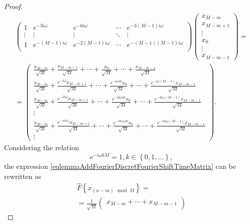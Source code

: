 \begin{proof}
\begin{eqnarray}
\begin{pmatrix}
1 & e^{-3 i \omega} & e^{-6 i \omega} & \cdots & 
e^{-3 \left( M - 1 \right) i \omega} \\
\vdots & \vdots & \vdots & \ddots & \vdots \\
1 & e^{-\left( M - 1 \right) i \omega} & e^{-2\left( M - 1 \right) i \omega} & \cdots & 
e^{- \left( M - 1 \right)\left( M - 1 \right) i \omega} \\
\end{pmatrix}
\begin{pmatrix}
x_{M - m} \\
x_{M - m + 1}\\ 
\vdots \\
x_0 \\
\vdots \\
x_{M - m - 1}
\end{pmatrix} = 
\nonumber \\
= 
\begin{pmatrix}
\frac{x_{M - m}}{\sqrt{M}} + \frac{x_{M - m + 1}}{\sqrt{M}} + \cdots + 
\frac{x_0}{\sqrt{M}} + \cdots + \frac{x_{M - m - 1}}{\sqrt{M}}\\
\frac{x_{M - m}}{\sqrt{M}} + 
\frac{e^{-i \omega} x_{M - m + 1}}{\sqrt{M}} + 
\cdots + 
\frac{e^{-i \omega m  } x_0}{\sqrt{M}} + 
\cdots +
\frac{e^{-i \omega \left( M - 1 \right) } x_{M - m - 1}}{\sqrt{M}}\\ 
\frac{x_{M - m}}{\sqrt{M}} + 
\frac{e^{-2 i \omega} x_{M - m + 1}}{\sqrt{M}} + 
\cdots + 
\frac{e^{-2 i \omega m  } x_0}{\sqrt{M}} + 
\cdots +
\frac{e^{-2 i \omega \left( M - 1 \right) } x_{M - m - 1}}{\sqrt{M}}\\ 
\vdots \\
\frac{x_{M - m}}{\sqrt{M}} + 
\frac{e^{-m i \omega} x_{M - m + 1}}{\sqrt{M}} + 
\cdots + 
\frac{e^{-m i \omega m  } x_0}{\sqrt{M}} + 
\cdots +
\frac{e^{-m i \omega \left( M - 1 \right) } x_{M - m - 1}}{\sqrt{M}}\\ 
\vdots 
\end{pmatrix}.
\label{eqlemmaAddFourierDiscretFourierShiftTimeMatrix}
\end{eqnarray}
Considering the relation
\[
e^{-i \omega k M} = 1, k \in \left\{0, 1, \dots \right\},
\]
the expression
\eqref{eqlemmaAddFourierDiscretFourierShiftTimeMatrix} can be rewritten as
\begin{eqnarray}
\hat{F}\left\{x_{\left(n - m\right) \mod M}\right\} = 
\nonumber \\
=
\frac{1}{\sqrt{M}}
\begin{pmatrix}
x_{M - m} + \cdots +
x_{M - m - 1}\\

\end{pmatrix}
\end{eqnarray}
\end{proof}
